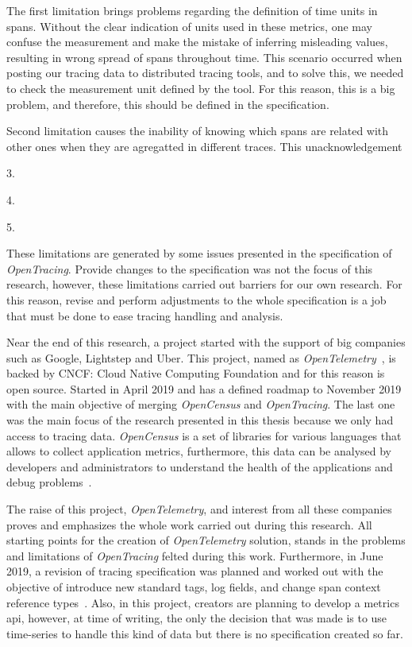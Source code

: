The first limitation brings problems regarding the definition of time units in spans. Without the clear indication of units used in these metrics, one may confuse the measurement and make the mistake of inferring misleading values, resulting in wrong spread of spans throughout time. This scenario occurred when posting our tracing data to distributed tracing tools, and to solve this, we needed to check the measurement unit defined by the tool. For this reason, this is a big problem, and therefore, this should be defined in the specification.

Second limitation causes the inability of knowing which spans are related with other ones when they are agregatted in different traces. This unacknowledgement 

3.

4.

5.

These limitations are generated by some issues presented in the specification of \emph{OpenTracing}. Provide changes to the specification was not the focus of this research, however, these limitations carried out barriers for our own research. For this reason, revise and perform adjustments to the whole specification is a job that must be done to ease tracing handling and analysis.

Near the end of this research, a project started with the support of big companies such as Google, Lightstep and Uber. This project, named as \emph{OpenTelemetry}~\cite{opentelemetry}, is backed by CNCF: Cloud Native Computing Foundation and for this reason is open source. Started in April 2019 and has a defined roadmap to November 2019 with the main objective of merging \emph{OpenCensus} and \emph{OpenTracing}. The last one was the main focus of the research presented in this thesis because we only had access to tracing data. \emph{OpenCensus} is a set of libraries for various languages that allows to collect application metrics, furthermore, this data can be analysed by developers and administrators to understand the health of the applications and debug problems~\cite{what_is_opencensus}. 

The raise of this project, \emph{OpenTelemetry}, and interest from all these companies proves and emphasizes the whole work carried out during this research. All starting points for the creation of \emph{OpenTelemetry} solution, stands in the problems and limitations of \emph{OpenTracing} felted during this work. Furthermore, in June 2019, a revision of tracing specification was planned and worked out with the objective of introduce new standard tags, log fields, and change span context reference types~\cite{opentelemetry_trace_specification}.
Also, in this project, creators are planning to develop a metrics \gls{api}, however, at time of writing, the only the decision that was made is to use time-series to handle this kind of data but there is no specification created so far.

